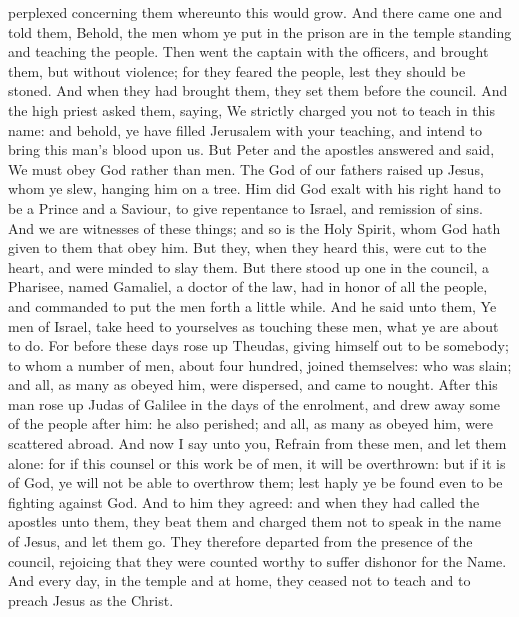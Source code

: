 perplexed concerning them whereunto this would grow. And there came one and told them, Behold, the men whom ye put in the prison are in the temple standing and teaching the people. Then went the captain with the officers, and brought them, but without violence; for they feared the people, lest they should be stoned. And when they had brought them, they set them before the council. And the high priest asked them, saying, We strictly charged you not to teach in this name: and behold, ye have filled Jerusalem with your teaching, and intend to bring this man’s blood upon us. But Peter and the apostles answered and said, We must obey God rather than men. The God of our fathers raised up Jesus, whom ye slew, hanging him on a tree. Him did God exalt with his right hand to be a Prince and a Saviour, to give repentance to Israel, and remission of sins. And we are witnesses of these things; and so is the Holy Spirit, whom God hath given to them that obey him.  But they, when they heard this, were cut to the heart, and were minded to slay them. But there stood up one in the council, a Pharisee, named Gamaliel, a doctor of the law, had in honor of all the people, and commanded to put the men forth a little while. And he said unto them, Ye men of Israel, take heed to yourselves as touching these men, what ye are about to do. For before these days rose up Theudas, giving himself out to be somebody; to whom a number of men, about four hundred, joined themselves: who was slain; and all, as many as obeyed him, were dispersed, and came to nought. After this man rose up Judas of Galilee in the days of the enrolment, and drew away some of the people after him: he also perished; and all, as many as obeyed him, were scattered abroad. And now I say unto you, Refrain from these men, and let them alone: for if this counsel or this work be of men, it will be overthrown: but if it is of God, ye will not be able to overthrow them; lest haply ye be found even to be fighting against God. And to him they agreed: and when they had called the apostles unto them, they beat them and charged them not to speak in the name of Jesus, and let them go. They therefore departed from the presence of the council, rejoicing that they were counted worthy to suffer dishonor for the Name. And every day, in the temple and at home, they ceased not to teach and to preach Jesus as the Christ. 


